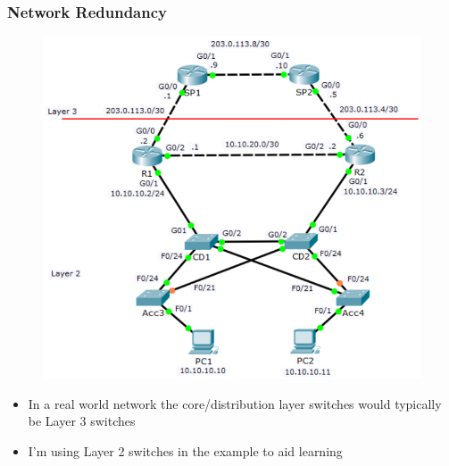 \documentclass[pdflatex,compress,mathserif]{beamer}
\begin{document}
\begin{frame}
	\frametitle{Network Redundancy}
	\begin{multicols}{2}
		\begin{figure}
			\centering
			\includegraphics[width=\linewidth]{img/img04}
		\end{figure}
		\columnbreak
		\begin{itemize}
			\item In a real world network the
core/distribution layer switches
would typically be Layer 3 switches
			\item I’m using Layer 2 switches in the
example to aid learning
		\end{itemize}
	\end{multicols}
\end{frame}
\end{document}
